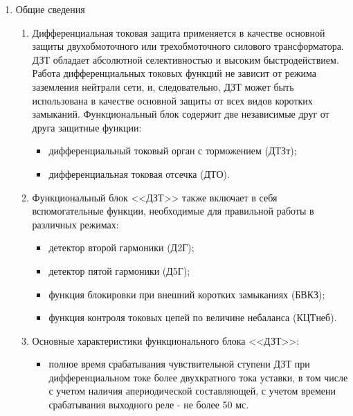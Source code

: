 \documentclass[a4paper, 12pt,table, hidelinks, DIV=calc]{extarticle} %
\begin{document}
\color{black}

\begin{enumerate}[label=\arabic{section}.\arabic{subsection}.\arabic{enumi}, labelsep=4pt, leftmargin=0pt, itemindent=57pt, itemsep=0pt, parsep=5pt] %
\item Общие сведения

\begin{enumerate}[label=\arabic{section}.\arabic{subsection}.\arabic{enumi}.\arabic*, labelsep=4pt, leftmargin=0em, itemindent=65pt, parsep=0pt]

\item
Дифференциальная токовая защита применяется в качестве основной защиты двухобмоточного или трехобмоточного силового трансформатора. ДЗТ обладает абсолютной селективностью и высоким быстродействием. Работа дифференциальных токовых функций не зависит от режима заземления нейтрали сети, и, следовательно, ДЗТ  может быть использована в качестве основной защиты от всех видов коротких замыканий. Функциональный блок содержит две независимые друг от друга защитные функции:
\begin{itemize}
\item дифференциальный токовый орган с торможением (ДТЗт);
\item дифференциальная токовая отсечка (ДТО).
\end{itemize}
\item
Функциональный блок <<ДЗТ>> также включает в себя вспомогательные функции, необходимые для правильной работы в различных режимах:
\begin{itemize}
    \item детектор второй гармоники (Д2Г);
    \item детектор пятой гармоники (Д5Г);
    \item функция блокировки при внешний коротких замыканиях (БВКЗ);
    \item функция контроля токовых цепей по величине небаланса (КЦТнеб).
\end{itemize}

\item
Основные характеристики функционального блока <<ДЗТ>>:
\begin{itemize}
    \item полное время срабатывания чувствительной ступени ДЗТ при дифференциальном токе более двухкратного тока уставки, в том числе с учетом наличия апериодической составляющей, с учетом времени срабатывания выходного реле - не более 50 мс.
\end{itemize}


\end{enumerate}
\end{enumerate}
\end{document}
